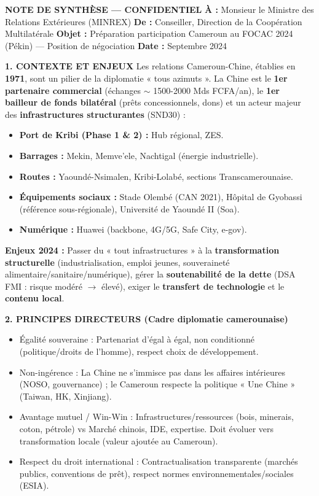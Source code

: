 \documentclass[11pt]{article}
\newcommand{\cle}[1]{{\popxbold\color{popdark}#1}}
\begin{document}
\begin{corrige}
\textbf{NOTE DE SYNTHÈSE — CONFIDENTIEL}
\textbf{À :} Monsieur le Ministre des Relations Extérieures (MINREX)
\textbf{De :} Conseiller, Direction de la Coopération Multilatérale
\textbf{Objet :} Préparation participation Cameroun au FOCAC 2024 (Pékin) — Position de négociation
\textbf{Date :} Septembre 2024

\vspace{0.5cm}
\noindent\textbf{1. CONTEXTE ET ENJEUX}
Les relations Cameroun-Chine, établies en \textbf{1971}, sont un pilier de la diplomatie « tous azimuts ». La Chine est le \textbf{1er partenaire commercial} (échanges $\sim$ 1500-2000 Mds FCFA/an), le \textbf{1er bailleur de fonds bilatéral} (prêts concessionnels, dons) et un acteur majeur des \textbf{infrastructures structurantes} (SND30) :
\begin{itemize}
    \item \textbf{Port de Kribi (Phase 1 \& 2) :} Hub régional, ZES.
    \item \textbf{Barrages :} Mekin, Memve'ele, Nachtigal (énergie industrielle).
    \item \textbf{Routes :} Yaoundé-Nsimalen, Kribi-Lolabé, sections Transcamerounaise.
    \item \textbf{Équipements sociaux :} Stade Olembé (CAN 2021), Hôpital de Gyobassi (référence sous-régionale), Université de Yaoundé II (Soa).
    \item \textbf{Numérique :} Huawei (backbone, 4G/5G, Safe City, e-gov).
\end{itemize}
\textbf{Enjeux 2024 :} Passer du « tout infrastructures » à la \textbf{transformation structurelle} (industrialisation, emploi jeunes, souveraineté alimentaire/sanitaire/numérique), gérer la \textbf{soutenabilité de la dette} (DSA FMI : risque modéré $\to$ élevé), exiger le \textbf{transfert de technologie} et le \textbf{contenu local}.

\vspace{0.3cm}
\noindent\textbf{2. PRINCIPES DIRECTEURS (Cadre diplomatie camerounaise)}
\begin{itemize}
    \item \cle{Égalité souveraine} : Partenariat d'égal à égal, non conditionné (politique/droits de l'homme), respect choix de développement.
    \item \cle{Non-ingérence} : La Chine ne s'immisce pas dans les affaires intérieures (NOSO, gouvernance) ; le Cameroun respecte la politique « Une Chine » (Taiwan, HK, Xinjiang).
    \item \cle{Avantage mutuel / Win-Win} : Infrastructures/ressources (bois, minerais, coton, pétrole) vs Marché chinois, IDE, expertise. Doit évoluer vers \cle{transformation locale} (valeur ajoutée au Cameroun).
    \item \cle{Respect du droit international} : Contractualisation transparente (marchés publics, conventions de prêt), respect normes environnementales/sociales (ESIA).
\end{itemize}


\end{corrige}
\end{document}
